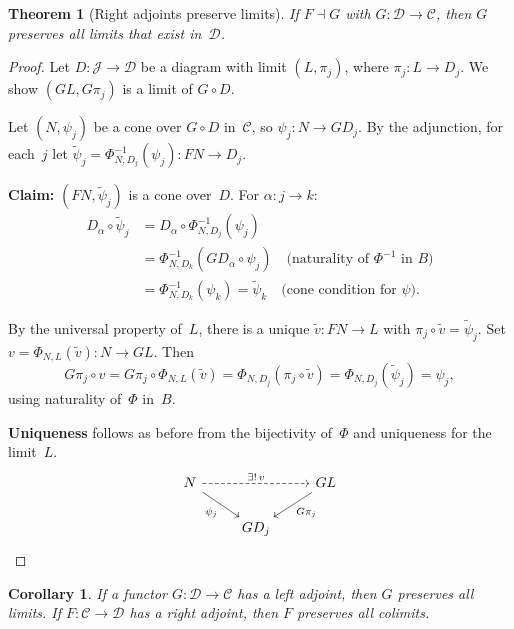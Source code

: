 \documentclass[a4paper,12pt]{book}
\theoremstyle{definition}
\theoremstyle{plain}
\newtheorem{theorem}[definition]{Theorem}
\newtheorem{corollary}[definition]{Corollary}
\theoremstyle{remark}
\begin{document}
\begin{theorem}[Right adjoints preserve limits]%
\label{thm:radj-preserve-lim}
If $F\dashv G$ with $G\colon\mathcal{D}\to\mathcal{C}$,
then $G$ preserves all limits that exist in~$\mathcal{D}$.
\end{theorem}

\begin{proof}
Let $D\colon\mathcal{J}\to\mathcal{D}$ be a diagram with limit
$(L,\pi_j)$, where $\pi_j\colon L\to D_j$.
We show $(GL,G\pi_j)$ is a limit of $G\circ D$.

Let $(N,\psi_j)$ be a cone over $G\circ D$ in~$\mathcal{C}$,
so $\psi_j\colon N\to GD_j$.
By the adjunction, for each~$j$ let
$\tilde\psi_j = \Phi^{-1}_{N,D_j}(\psi_j)\colon FN\to D_j$.

\textbf{Claim:} $(FN,\tilde\psi_j)$ is a cone over~$D$.
For $\alpha\colon j\to k$:
\begin{align*}
D_\alpha\circ\tilde\psi_j
&= D_\alpha\circ\Phi^{-1}_{N,D_j}(\psi_j) \\
&= \Phi^{-1}_{N,D_k}(GD_\alpha\circ\psi_j)
  \quad\text{(naturality of $\Phi^{-1}$ in $B$)} \\
&= \Phi^{-1}_{N,D_k}(\psi_k) = \tilde\psi_k
  \quad\text{(cone condition for $\psi$)}.
\end{align*}

By the universal property of~$L$, there is a unique
$\tilde v\colon FN\to L$ with $\pi_j\circ\tilde v = \tilde\psi_j$.
Set $v = \Phi_{N,L}(\tilde v)\colon N\to GL$.  Then
\[
    G\pi_j\circ v = G\pi_j\circ\Phi_{N,L}(\tilde v)
    = \Phi_{N,D_j}(\pi_j\circ\tilde v)
    = \Phi_{N,D_j}(\tilde\psi_j) = \psi_j,
\]
using naturality of~$\Phi$ in~$B$.

\textbf{Uniqueness} follows as before from the bijectivity of~$\Phi$
and uniqueness for the limit~$L$.
\[
\begin{tikzcd}
N \arrow[dr, "\psi_j"'] \arrow[rr, dashed, "\exists!\, v"]
& & GL \arrow[dl, "G\pi_j"] \\
& GD_j &
\end{tikzcd}
\]
\end{proof}

\begin{corollary}\label{cor:limits-detect-adjoints}
If a functor $G\colon\mathcal{D}\to\mathcal{C}$ has a left adjoint,
then $G$ preserves all limits.
If $F\colon\mathcal{C}\to\mathcal{D}$ has a right adjoint,
then $F$ preserves all colimits.
\end{corollary}
\end{document}
